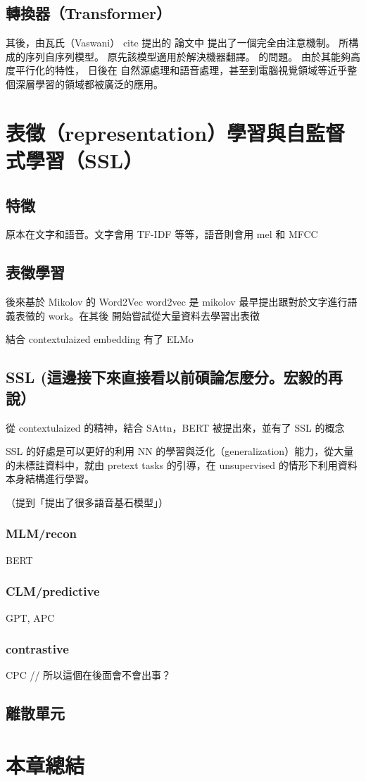 \subsection{轉換器（Transformer）}

其後，由瓦氏（Vaswani） cite 提出的 論文中 提出了一個完全由注意機制。 所構成的序列自序列模型。 原先該模型適用於解決機器翻譯。 的問題。
由於其能夠高度平行化的特性， 日後在 自然源處理和語音處理，甚至到電腦視覺領域等近乎整個深層學習的領域都被廣泛的應用。  

\section{表徵（representation）學習與自監督式學習（SSL）}

\subsection{特徵}

原本在文字和語音。文字會用 TF-IDF 等等，語音則會用 mel 和 MFCC

\subsection{表徵學習}

後來基於 Mikolov 的 Word2Vec
word2vec 是 mikolov \CITEME 最早提出跟對於文字進行語義表徵的 work。在其後
開始嘗試從大量資料去學習出表徵

結合 contextulaized embedding 有了 ELMo

\subsection{SSL (這邊接下來直接看以前碩論怎麼分。宏毅的再說）}

從 contextulaized 的精神，結合 SAttn，BERT 被提出來，並有了 SSL 的概念

SSL 的好處是可以更好的利用 NN 的學習與泛化（generalization）能力，從大量的未標註資料中，就由 pretext tasks 的引導，在 unsupervised 的情形下利用資料本身結構進行學習。

（提到「提出了很多語音基石模型」）

\subsubsection{MLM/recon}

BERT

\subsubsection{CLM/predictive}

GPT, APC

\subsubsection{contrastive}

CPC // 所以這個在後面會不會出事？

\subsection{離散單元}

\section{本章總結}



